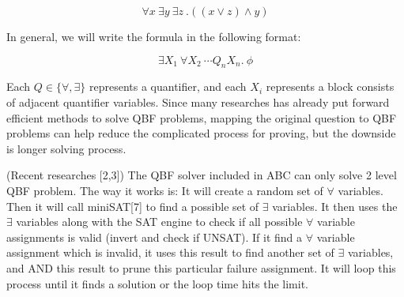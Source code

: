 \[ \forall x\ \exists y\ \exists z\ .((x\lor z)\land y) \]

In general, we will write the formula in the following format:

\[ \exists X_1\ \forall X_2\ \cdots Q_nX_n .~\phi \]

Each $Q \in \{\forall, \exists\}$ represents a quantifier, and each $X_i$ represents a block consists of adjacent quantifier variables. Since many researches has already put forward efficient methods to solve QBF problems, mapping the original question to QBF problems can help reduce the complicated process for proving, but the downside is longer solving process.


(Recent researches [2,3]) The QBF solver included in ABC can only solve 2 level QBF problem.
The way it works is: It will create a random set of $\forall$ variables. Then it will call miniSAT[7] to find a possible set of $\exists$ variables. It then uses the $\exists$ variables along with the SAT engine to check if all possible $\forall$ variable assignments is valid (invert and check if UNSAT). If it find a $\forall$ variable assignment which is invalid, it uses this result to find another set of $\exists$ variables, and AND this result to prune this particular failure assignment. It will loop this process until it finds a solution or the loop time hits the limit.

